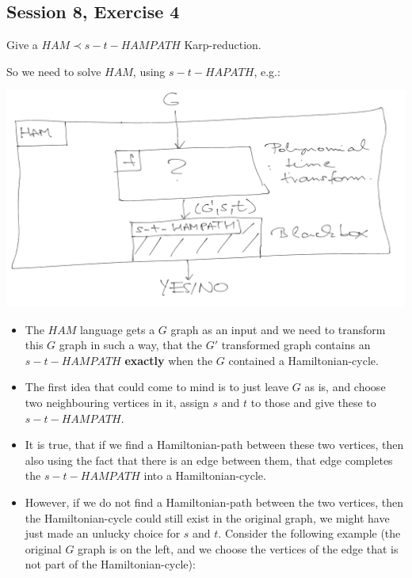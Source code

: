 \subsection {Session 8, Exercise 4}
\label{8f4}


Give a $HAM \prec s-t-HAMPATH$ Karp-reduction.


So we need to solve $HAM$, using $s-t-HAPATH$, e.g.:

\begin{center}
    \includegraphics[width=\linewidth]{./08/03/ham_stham_karp.png}
\end{center}

\begin{itemize}
    \item The $HAM$ language gets a $G$ graph as an input and we need to transform this $G$ graph in such a way, that the $G'$ transformed graph contains an $s-t-HAMPATH$ \textbf{exactly} when the $G$ contained a Hamiltonian-cycle.
    \item The first idea that could come to mind is to just leave $G$ as is, and choose two neighbouring vertices in it, assign $s$ and $t$ to those and give these to $s-t-HAMPATH$.
    \item It is true, that if we find a Hamiltonian-path between these two vertices, then also using the fact that there is an edge between them, that edge completes the $s-t-HAMPATH$ into a Hamiltonian-cycle.
    \item However, if we do not find a Hamiltonian-path between the two vertices, then the Hamiltonian-cycle could still exist in the original graph, we might have just made an unlucky choice for $s$ and $t$. Consider the following example (the original $G$ graph is on the left, and we choose the vertices of the edge that is not part of the Hamiltonian-cycle):
\end{itemize}

